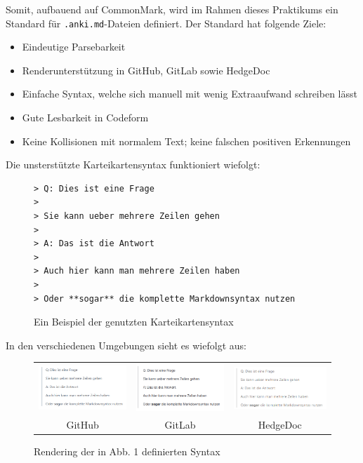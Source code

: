 \documentclass[ngerman]{article}
\begin{document}
Somit, aufbauend auf CommonMark, wird im Rahmen dieses Praktikums ein Standard für \texttt{.anki.md}-Dateien definiert. Der Standard hat folgende Ziele:
\begin{itemize}
  \item Eindeutige Parsebarkeit
  \item Renderunterstützung in GitHub, GitLab sowie HedgeDoc
  \item Einfache Syntax, welche sich manuell mit wenig Extraaufwand schreiben lässt
  \item Gute Lesbarkeit in Codeform
  \item Keine Kollisionen mit normalem Text; keine falschen positiven Erkennungen
\end{itemize}

Die unsterstützte Karteikartensyntax funktioniert wiefolgt:
\begin{figure}[H]
\centering
\begin{lstlisting}
> Q: Dies ist eine Frage
>
> Sie kann ueber mehrere Zeilen gehen
>
> A: Das ist die Antwort
>
> Auch hier kann man mehrere Zeilen haben
>
> Oder **sogar** die komplette Markdownsyntax nutzen
\end{lstlisting}
  \caption{Ein Beispiel der genutzten Karteikartensyntax}
\end{figure}
In den verschiedenen Umgebungen sieht es wiefolgt aus:

\begin{figure}[H]
\centering
\begin{tabular}{ccc}
\includegraphics[width=50mm]{./figures/GH_Syntax1} & \includegraphics[width=50mm]{./figures/GL_Syntax1} & \includegraphics[width=50mm]{./figures/HD_Syntax1} \\
GitHub & GitLab & HedgeDoc \\
\end{tabular}
\caption{Rendering der in Abb. 1 definierten Syntax}
\end{figure}
\end{document}
